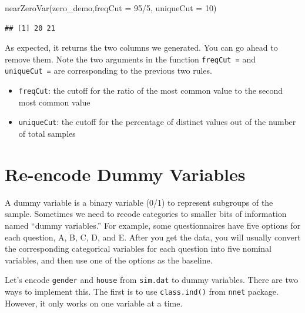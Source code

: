 \documentclass[
  12pt,
]{krantz}
\makeatletter
\newenvironment{Shaded}{\begin{snugshade}}{\end{snugshade}}
\newcommand{\AttributeTok}[1]{\textcolor[rgb]{0.61,0.61,0.61}{#1}}
\newcommand{\DecValTok}[1]{\textcolor[rgb]{0.06,0.06,0.06}{#1}}
\newcommand{\FunctionTok}[1]{\textcolor[rgb]{0,0,0}{#1}}
\newcommand{\NormalTok}[1]{#1}
\newcommand{\OtherTok}[1]{\textcolor[rgb]{0.37,0.37,0.37}{#1}}
\newcommand{\SpecialCharTok}[1]{\textcolor[rgb]{0,0,0}{#1}}
\providecommand{\tightlist}{%
  \setlength{\itemsep}{0pt}\setlength{\parskip}{0pt}}
\newenvironment{kframe}{%
\medskip{}
\setlength{\fboxsep}{.8em}
 \def\at@end@of@kframe{}%
 \ifinner\ifhmode%
  \def\at@end@of@kframe{\end{minipage}}%
  \begin{minipage}{\columnwidth}%
 \fi\fi%
 \def\FrameCommand##1{\hskip\@totalleftmargin \hskip-\fboxsep
 \colorbox{shadecolor}{##1}\hskip-\fboxsep
     \hskip-\linewidth \hskip-\@totalleftmargin \hskip\columnwidth}%
 \MakeFramed {\advance\hsize-\width
   \@totalleftmargin\z@ \linewidth\hsize
   \@setminipage}}%
 {\par\unskip\endMakeFramed%
 \at@end@of@kframe}
\renewenvironment{Shaded}{\begin{kframe}}{\end{kframe}}
\makeatother
\begin{document}
\begin{Shaded}
\begin{Highlighting}[]
\FunctionTok{nearZeroVar}\NormalTok{(zero\_demo,}\AttributeTok{freqCut =} \DecValTok{95}\SpecialCharTok{/}\DecValTok{5}\NormalTok{, }\AttributeTok{uniqueCut =} \DecValTok{10}\NormalTok{)}
\end{Highlighting}
\end{Shaded}

\begin{verbatim}
## [1] 20 21
\end{verbatim}

As expected, it returns the two columns we generated. You can go ahead to remove them. Note the two arguments in the function \texttt{freqCut\ =} and \texttt{uniqueCut\ =} are corresponding to the previous two rules.

\begin{itemize}
\tightlist
\item
  \texttt{freqCut}: the cutoff for the ratio of the most common value to the second most common value
\item
  \texttt{uniqueCut}: the cutoff for the percentage of distinct values out of the number of total samples
\end{itemize}

\hypertarget{re-encode-dummy-variables}{%
\section{Re-encode Dummy Variables}\label{re-encode-dummy-variables}}

A dummy variable is a binary variable (0/1) to represent subgroups of the sample. Sometimes we need to recode categories to smaller bits of information named ``dummy variables.'' For example, some questionnaires have five options for each question, A, B, C, D, and E. After you get the data, you will usually convert the corresponding categorical variables for each question into five nominal variables, and then use one of the options as the baseline.

Let's encode \texttt{gender} and \texttt{house} from \texttt{sim.dat} to dummy variables. There are two ways to implement this. The first is to use \texttt{class.ind()} from \texttt{nnet} package. However, it only works on one variable at a time.

\begin{Shaded}
\end{Shaded}
\end{document}
